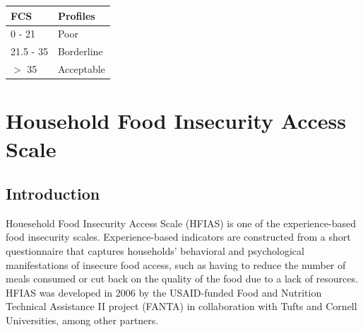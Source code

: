 \documentclass[12pt,]{book}
\theoremstyle{definition}
\theoremstyle{definition}
\theoremstyle{definition}
\theoremstyle{remark}
\begin{document}
\begin{longtable}[]{@{}ll@{}}
\toprule
\begin{minipage}[b]{0.27\columnwidth}\raggedright
\textbf{FCS}\strut
\end{minipage} & \begin{minipage}[b]{0.54\columnwidth}\raggedright
\textbf{Profiles}\strut
\end{minipage}\tabularnewline
\midrule
\endhead
\begin{minipage}[t]{0.27\columnwidth}\raggedright
0 - 21\strut
\end{minipage} & \begin{minipage}[t]{0.54\columnwidth}\raggedright
Poor\strut
\end{minipage}\tabularnewline
\begin{minipage}[t]{0.27\columnwidth}\raggedright
21.5 - 35\strut
\end{minipage} & \begin{minipage}[t]{0.54\columnwidth}\raggedright
Borderline\strut
\end{minipage}\tabularnewline
\begin{minipage}[t]{0.27\columnwidth}\raggedright
\(>\) 35\strut
\end{minipage} & \begin{minipage}[t]{0.54\columnwidth}\raggedright
Acceptable\strut
\end{minipage}\tabularnewline
\bottomrule
\end{longtable}

\hypertarget{hfias}{%
\chapter{Household Food Insecurity Access Scale}\label{hfias}}

\hypertarget{introduction-3}{%
\section{Introduction}\label{introduction-3}}

Houesehold Food Insecurity Access Scale (HFIAS) is one of the
experience-based food insecurity scales. Experience-based indicators are
constructed from a short questionnaire that captures households'
behavioral and psychological manifestations of insecure food access,
such as having to reduce the number of meals consumed or cut back on the
quality of the food due to a lack of resources. HFIAS was developed in
2006 by the USAID-funded Food and Nutrition Technical Assistance II
project (FANTA) in collaboration with Tufts and Cornell Universities,
among other partners.
\end{document}
